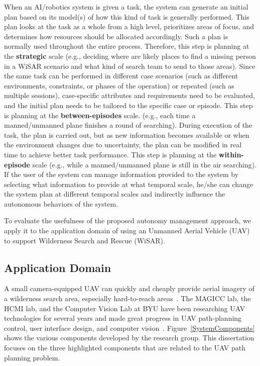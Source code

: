 When an AI/robotics system is given a task, the system can generate an initial plan based on its model(s) of how this kind of task is generally performed. This plan looks at the task as a whole from a high level, prioritizes areas of focus, and determines how resources should be allocated accordingly. Such a plan is normally used throughout the entire process. Therefore, this step is planning at the \textbf{strategic} scale (e.g., deciding where are likely places to find a missing person in a WiSAR scenario and what kind of search team to send to those areas). Since the same task can be performed in different case scenarios (such as different environments, constraints, or phases of the operation) or repeated (such as multiple sessions), case-specific attributes and requirements need to be evaluated, and the initial plan needs to be tailored to the specific case or episode. This step is planning at the \textbf{between-episodes} scale. (e.g., each time a manned/unmanned plane finishes a round of searching). During execution of the task, the plan is carried out, but as new information becomes available or when the environment changes due to uncertainty, the plan can be modified in real time to achieve better task performance. This step is planning at the \textbf{within-episode} scale (e.g., while a manned/unmanned plane is still in the air searching). If the user of the system can manage information provided to the system by selecting what information to provide at what temporal scale, he/she can change the system plan at different temporal scales and indirectly influence the autonomous behaviors of the system.

To evaluate the usefulness of the proposed autonomy management approach, we apply it to the application domain of using an Unmanned Aerial Vehicle (UAV) to support Wilderness Search and Rescue (WiSAR).

\subsection{Application Domain}

A small camera-equipped UAV can quickly and cheaply provide aerial imagery of a wilderness search area, especially hard-to-reach areas~\cite{Goodrich2008Supporting}. The MAGICC lab, the HCMI lab, and the Computer Vision Lab at BYU have been researching UAV technologies for several years and made great progress in UAV path-planning control, user interface design, and computer vision~\cite{Lin2010Supporting}. Figure~\ref{SystemComponents} shows the various components developed by the research group. This dissertation focuses on the three highlighted components that are related to the UAV path planning problem.

